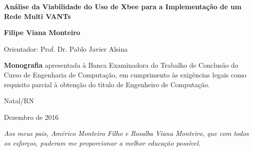 %

\begin{titlepage}
%
\begin{center}
%

%
\Large \textbf{Análise da Viabilidade do Uso de Xbee para a Implementação de um Rede Multi VANTs}


\vfill

\Large \textbf{Filipe Viana Monteiro}

\bigskip
\bigskip
\bigskip
\bigskip

\normalsize

Orientador: Prof. Dr. Pablo Javier Alsina

\vfill

\hfill
\parbox{0.5\linewidth}{
\textbf{Monografia}
apresentada \`{a} Banca Examinadora do Trabalho de Conclus\~{a}o do Curso de
Engenharia de Computa\c{c}\~{a}o, em cumprimento \`{a}s exig\^{e}ncias
legais como requisito parcial \`{a} obten\c{c}\~{a}o do t\'{\i}tulo de Engenheiro de
Computa\c{c}\~{a}o.}

\vfill

\large

Natal/RN

Dezembro de 2016

\end{center}
\end{titlepage}

%
%


\begin{titlepage}

\vspace*{\fill}

\hfill
\begin{minipage}{0.5\linewidth}
\begin{flushright}
\large\it
Aos meus pais, Américo Monteiro Filho e Rosalba Viana Monteiro, que com todos os esforços, puderam me proporcionar a melhor educação possível.

\end{flushright}
\end{minipage}

\vspace*{\fill}

\end{titlepage}

